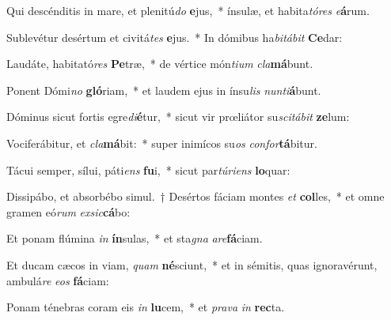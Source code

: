\item Qui descénditis in mare, et plenitú\textit{do} \textbf{e}jus,~* ínsulæ, et habita\textit{tó}\textit{res} \textit{e}\textbf{á}rum.
\item Sublevétur desértum et civitá\textit{tes} \textbf{e}jus.~* In dómibus ha\textit{bi}\textit{tá}\textit{bit} \textbf{Ce}dar:
\item Laudáte, habitató\textit{res} \textbf{Pe}træ,~* de vértice món\textit{ti}\textit{um} \textit{cla}\textbf{má}bunt.
\item Ponent Dómi\textit{no} \textbf{gló}riam,~* et laudem ejus in ínsu\textit{lis} \textit{nun}\textit{ti}\textbf{á}bunt.
\item Dóminus sicut fortis egre\textit{di}\textbf{é}tur,~* sicut vir prœliátor su\textit{sci}\textit{tá}\textit{bit} \textbf{ze}lum:
\item Vociferábitur, et \textit{cla}\textbf{má}bit:~* super inimícos su\textit{os} \textit{con}\textit{for}\textbf{tá}bitur.
\item Tácui semper, sílui, páti\textit{ens} \textbf{fu}i,~* sicut par\textit{tú}\textit{ri}\textit{ens} \textbf{lo}quar:
\item Dissipábo, et absorbébo simul.~† Desértos fáciam montes \textit{et} \textbf{col}les,~* et omne gramen eó\textit{rum} \textit{ex}\textit{sic}\textbf{cá}bo:
\item Et ponam flúmina \textit{in} \textbf{ín}sulas,~* et sta\textit{gna} \textit{a}\textit{re}\textbf{fá}ciam.
\item Et ducam cæcos in viam, \textit{quam} \textbf{né}sciunt,~* et in sémitis, quas ignoravérunt, ambulá\textit{re} \textit{e}\textit{os} \textbf{fá}ciam:
\item Ponam ténebras coram eis \textit{in} \textbf{lu}cem,~* et \textit{pra}\textit{va} \textit{in} \textbf{rec}ta.

